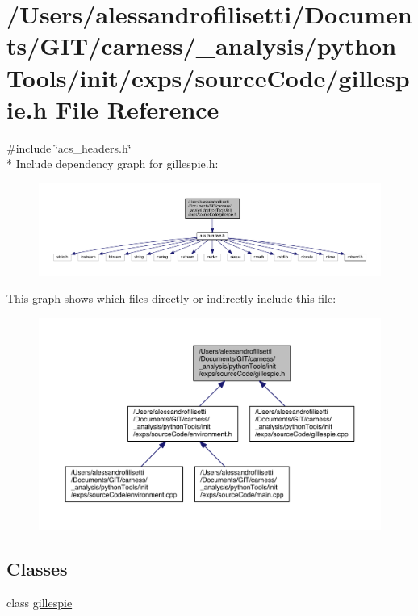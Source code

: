 \hypertarget{a00066}{\section{/\+Users/alessandrofilisetti/\+Documents/\+G\+I\+T/carness/\+\_\+analysis/python\+Tools/init/exps/source\+Code/gillespie.h File Reference}
\label{a00066}
}
{\ttfamily \#include \char`\"{}acs\+\_\+headers.\+h\char`\"{}}\\*
Include dependency graph for gillespie.\+h\+:\nopagebreak
\begin{figure}[H]
\begin{center}
\leavevmode
\includegraphics[width=350pt]{a00186}
\end{center}
\end{figure}
This graph shows which files directly or indirectly include this file\+:\nopagebreak
\begin{figure}[H]
\begin{center}
\leavevmode
\includegraphics[width=350pt]{a00187}
\end{center}
\end{figure}
\subsection*{Classes}
\begin{DoxyCompactItemize}
\item 
class \hyperlink{a00014}{gillespie}
\end{DoxyCompactItemize}
